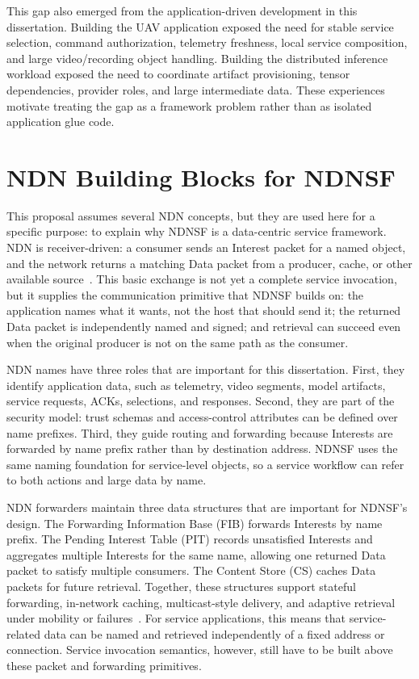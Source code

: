 This gap also emerged from the application-driven development in this
dissertation. Building the UAV application exposed the need for stable service
selection, command authorization, telemetry freshness, local service
composition, and large video/recording object handling. Building the
distributed inference workload exposed the need to coordinate artifact
provisioning, tensor dependencies, provider roles, and large intermediate data.
These experiences motivate treating the gap as a framework problem rather than
as isolated application glue code.

\section{NDN Building Blocks for NDNSF}

This proposal assumes several NDN concepts, but they are used here for a
specific purpose: to explain why NDNSF is a data-centric service framework. NDN
is receiver-driven: a consumer sends an Interest packet for a named object, and
the network returns a matching Data packet from a producer, cache, or other
available source~\cite{ndn}. This basic exchange is not yet a complete service
invocation, but it supplies the communication primitive that NDNSF builds on:
the application names what it wants, not the host that should send it; the
returned Data packet is independently named and signed; and retrieval can
succeed even when the original producer is not on the same path as the consumer.

NDN names have three roles that are important for this dissertation. First,
they identify application data, such as telemetry, video segments, model
artifacts, service requests, ACKs, selections, and responses. Second, they are
part of the security model: trust schemas and access-control attributes can be
defined over name prefixes. Third, they guide routing and forwarding because
Interests are forwarded by name prefix rather than by destination address.
NDNSF uses the same naming foundation for service-level objects, so a service
workflow can refer to both actions and large data by name.

NDN forwarders maintain three data structures that are important for NDNSF's
design. The Forwarding Information Base (FIB) forwards Interests by name
prefix. The Pending Interest Table (PIT) records unsatisfied Interests and
aggregates multiple Interests for the same name, allowing one returned Data
packet to satisfy multiple consumers. The Content Store (CS) caches Data
packets for future retrieval. Together, these structures support stateful
forwarding, in-network caching, multicast-style delivery, and adaptive
retrieval under mobility or failures~\cite{yi2013case}. For service
applications, this means that service-related data can be named and retrieved
independently of a fixed address or connection. Service invocation semantics,
however, still have to be built above these packet and forwarding primitives.


